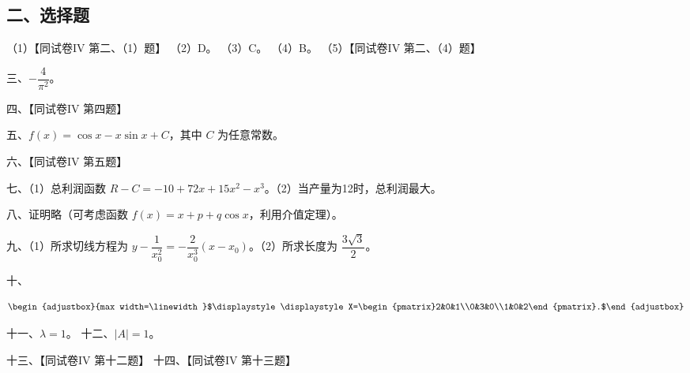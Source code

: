 \documentclass[UTF8,12pt]{ctexart}
\newcommand{\fitmath}[1]{\begin{adjustbox}{max width=\linewidth}$\displaystyle #1$\end{adjustbox}}
\begin{document}
\subsection*{二、选择题}

（1）【同试卷IV 第二、（1）题】 （2）D。 （3）C。 （4）B。 （5）【同试卷IV 第二、（4）题】


三、\(\displaystyle -\dfrac{\displaystyle 4}{\displaystyle \pi^2}\)。


四、【同试卷IV 第四题】


五、\(\displaystyle f(x)=\cos x-x\sin x+C\)，其中 \(\displaystyle C\) 为任意常数。


六、【同试卷IV 第五题】


七、（1）总利润函数 \(\displaystyle R-C=-10+72x+15x^2-x^3\)。（2）当产量为12时，总利润最大。


八、证明略（可考虑函数 \(\displaystyle f(x)=x+p+q\cos x\)，利用介值定理）。


九、（1）所求切线方程为 \(\displaystyle y-\dfrac{\displaystyle 1}{\displaystyle x_0^2}=-\dfrac{\displaystyle 2}{\displaystyle x_0^3}(x-x_0)\)。（2）所求长度为 \(\displaystyle \dfrac{\displaystyle 3\sqrt3}{\displaystyle 2}\)。


十、


\[\fitmath{\displaystyle X=\begin{pmatrix}2&0&1\\0&3&0\\1&0&2\end{pmatrix}.}\]


十一、\(\displaystyle \lambda=1\)。 十二、\(\displaystyle |A|=1\)。


十三、【同试卷IV 第十二题】 十四、【同试卷IV 第十三题】
\end{document}

